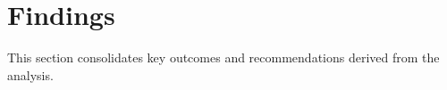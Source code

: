 \section{Findings}

This section consolidates key outcomes and recommendations derived from the analysis.
